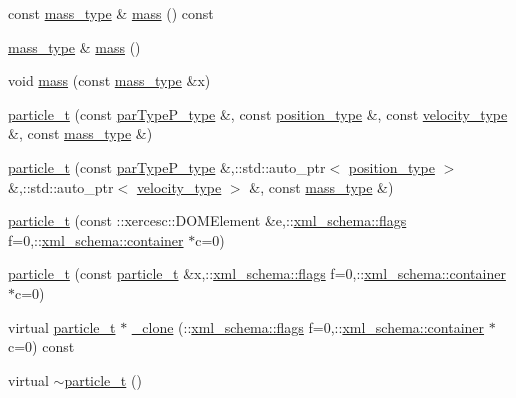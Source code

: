 \begin{DoxyCompactItemize}
\item 
const \hyperlink{classparticle__t_a38e9f2cf40d61fa77b19f068d044d294}{mass\-\_\-type} \& \hyperlink{classparticle__t_af8869f0d18a953140a8edf511c314f56}{mass} () const 
\item 
\hyperlink{classparticle__t_a38e9f2cf40d61fa77b19f068d044d294}{mass\-\_\-type} \& \hyperlink{classparticle__t_a86815bfd3b0b1cc4bb133f5f2608becf}{mass} ()
\item 
void \hyperlink{classparticle__t_af1646ca7c088a79e227d62f4a535e3b4}{mass} (const \hyperlink{classparticle__t_a38e9f2cf40d61fa77b19f068d044d294}{mass\-\_\-type} \&x)
\item 
\hyperlink{classparticle__t_aed5c9af92d0ad620cfba62e40c5e9239}{particle\-\_\-t} (const \hyperlink{classparticle__t_ab30c5ebbd1c4aabb95799f34942b72b2}{par\-Type\-P\-\_\-type} \&, const \hyperlink{classparticle__t_af0130f9c47a13c68332f04389a6f0d2c}{position\-\_\-type} \&, const \hyperlink{classparticle__t_a19095006cf2a2dd955fc026420b38512}{velocity\-\_\-type} \&, const \hyperlink{classparticle__t_a38e9f2cf40d61fa77b19f068d044d294}{mass\-\_\-type} \&)
\item 
\hyperlink{classparticle__t_a07a9ce2f3386bfe065bb3af0680c1b0f}{particle\-\_\-t} (const \hyperlink{classparticle__t_ab30c5ebbd1c4aabb95799f34942b72b2}{par\-Type\-P\-\_\-type} \&,\-::std\-::auto\-\_\-ptr$<$ \hyperlink{classparticle__t_af0130f9c47a13c68332f04389a6f0d2c}{position\-\_\-type} $>$ \&,\-::std\-::auto\-\_\-ptr$<$ \hyperlink{classparticle__t_a19095006cf2a2dd955fc026420b38512}{velocity\-\_\-type} $>$ \&, const \hyperlink{classparticle__t_a38e9f2cf40d61fa77b19f068d044d294}{mass\-\_\-type} \&)
\item 
\hyperlink{classparticle__t_a7ee9d95821b0e1840f4834029fb04c3b}{particle\-\_\-t} (const \-::xercesc\-::\-D\-O\-M\-Element \&e,\-::\hyperlink{namespacexml__schema_a0612287d030cb2732d31a45b258fdc87}{xml\-\_\-schema\-::flags} f=0,\-::\hyperlink{namespacexml__schema_ada9aa30dc722e93ee2ed7243085402a5}{xml\-\_\-schema\-::container} $\ast$c=0)
\item 
\hyperlink{classparticle__t_a393bb37e0c1e50ee3e2c2d1b7aef0f1a}{particle\-\_\-t} (const \hyperlink{classparticle__t}{particle\-\_\-t} \&x,\-::\hyperlink{namespacexml__schema_a0612287d030cb2732d31a45b258fdc87}{xml\-\_\-schema\-::flags} f=0,\-::\hyperlink{namespacexml__schema_ada9aa30dc722e93ee2ed7243085402a5}{xml\-\_\-schema\-::container} $\ast$c=0)
\item 
virtual \hyperlink{classparticle__t}{particle\-\_\-t} $\ast$ \hyperlink{classparticle__t_a7f3173200bb6bc6370c5b3284b5b97eb}{\-\_\-clone} (\-::\hyperlink{namespacexml__schema_a0612287d030cb2732d31a45b258fdc87}{xml\-\_\-schema\-::flags} f=0,\-::\hyperlink{namespacexml__schema_ada9aa30dc722e93ee2ed7243085402a5}{xml\-\_\-schema\-::container} $\ast$c=0) const 
\item 
virtual \hyperlink{classparticle__t_aadfae8ce4510f63d48a4dc207f890d92}{$\sim$particle\-\_\-t} ()
\end{DoxyCompactItemize}
